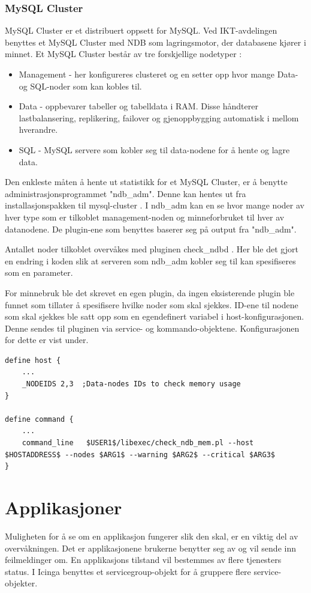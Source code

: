 \subsubsection{MySQL Cluster}

MySQL Cluster er et distribuert oppsett for MySQL. Ved IKT-avdelingen benyttes et MySQL Cluster med NDB som lagringsmotor, der databasene kjører i minnet. Et MySQL Cluster består av tre forskjellige nodetyper \cite{ndbinformation}:

\begin{itemize}
	\item Management - her konfigureres clusteret og en setter opp hvor mange Data- og SQL-noder som kan kobles til.
	\item Data - oppbevarer tabeller og tabelldata i RAM. Disse håndterer lastbalansering, replikering, failover og gjenoppbygging automatisk i mellom hverandre.
	\item SQL - MySQL servere som kobler seg til data-nodene for å hente og lagre data.
\end{itemize}


Den enkleste måten å hente ut statistikk for et MySQL Cluster, er å benytte administrasjonsprogrammet "ndb\_adm". Denne kan hentes ut fra installasjonspakken til mysql-cluster \cite{ndbdownload}. I ndb\_adm kan en se hvor mange noder av hver type som er tilkoblet management-noden og minneforbruket til hver av datanodene. De plugin-ene som benyttes baserer seg på output fra "ndb\_adm".

Antallet noder tilkoblet overvåkes med pluginen check\_ndbd \cite{ndbnode}. Her ble det gjort en endring i koden slik at serveren som ndb\_adm kobler seg til kan spesifiseres som en parameter.

For minnebruk ble det skrevet en egen plugin, da ingen eksisterende plugin ble funnet som tillater å spesifisere hvilke noder som skal sjekkes. ID-ene til nodene som skal sjekkes ble satt opp som en egendefinert variabel i host-konfigurasjonen. Denne sendes til pluginen via service- og kommando-objektene. Konfigurasjonen for dette er vist under.

\begin{lstlisting}
define host {
	...
	_NODEIDS 2,3  ;Data-nodes IDs to check memory usage
}

define command {
	...
	command_line   $USER1$/libexec/check_ndb_mem.pl --host $HOSTADDRESS$ --nodes $ARG1$ --warning $ARG2$ --critical $ARG3$
}
\end{lstlisting}
\section{Applikasjoner}
Muligheten for å se om en applikasjon fungerer slik den skal, er en viktig del av overvåkningen. Det er applikasjonene brukerne benytter seg av og vil sende inn feilmeldinger om. En applikasjons tilstand vil bestemmes av flere tjenesters status. I Icinga benyttes et servicegroup-objekt for å gruppere flere service-objekter.

